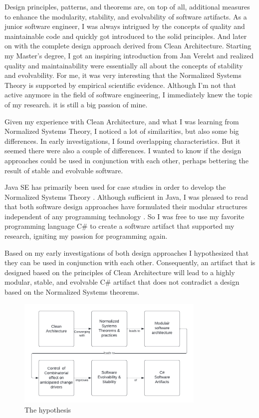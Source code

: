 Design principles, patterns, and theorems are, on top of all, additional measures to
enhance the modularity, stability, and evolvability of software artifacts. As a junior
software engineer, I was always intrigued by the concepts of quality and maintainable code
and quickly got introduced to the \gls{solid} principles. And later on with the complete
design approach derived from Clean Architecture. Starting my Master's degree, I got an
inspiring introduction from Jan Verelst and realized quality and maintainability were
essentially all about the concepts of stability and evolvability. For me, it was very
interesting that the Normalized Systems Theory is supported by empirical scientific
evidence. Although I'm not that active anymore in the field of software engineering, I
immediately knew the topic of my research. it is still a big passion of mine.

Given my experience with Clean Architecture, and what I was learning from Normalized
Systems Theory, I noticed a lot of similarities, but also some big differences. In early
investigations, I found overlapping characteristics. But it seemed there were also a couple
of differences. I wanted to know if the design approaches could be used in conjunction with
each other, perhaps bettering the result of stable and evolvable software.

Java SE has primarily been used for case studies in order to develop the Normalized
Systems Theory \parencite{oorts_building_2014, de_bruyn_enabling_2018}. Although
sufficient in Java, I was pleased to read that both software design approaches have
formulated their modular structures independent of any programming technology
\parencite{mannaert_normalized_2009,robert_c_martin_clean_2018}. So I was free to use my
favorite programming language C\# to create a software artifact that supported my
research, igniting my passion for programming again. 

Based on my early investigations of both design approaches I hypothesized that they can be
used in conjunction with each other. Consequently, an artifact that is designed based on
the principles of Clean Architecture will lead to a highly modular, stable, and evolvable
C\# artifact that does not contradict a design based on the Normalized Systems theorems.

\begin{figure}[H]
    \centering
    \includegraphics[width=0.8\textwidth]{Figures/hypothesis.pdf}
    \caption[The hypothesis]{The hypothesis}
    \label{fig_hypothesis}
\end{figure}


%


